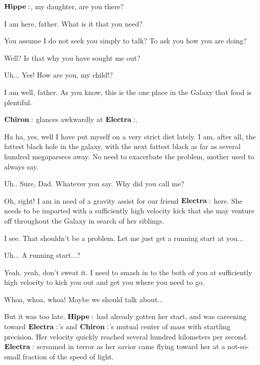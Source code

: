 \Chiron $\Hippe$, my daughter, are you there?

\Hippe I am here, father.  What is it that you need?

\Chiron You assume I do not seek you simply to talk?  To ask you how you are doing?

\Hippe Well?  Is that why you have sought me out?

\Chiron Uh... Yes!  How are you, my child!?

\Hippe I am well, father.  As you know, this is the one place in the Galaxy that food is plentiful.  

$\Chiron$ glances awkwardly at $\Electra$.

\Chiron Ha ha, yes, well I have put myself on a very strict diet lately.  I am, after all, the fattest black hole in the galaxy, with the next fattest black as far as several hundred megaparsecs away.  No need to exacerbate the problem, mother used to always say.

\Hippe Uh.. Sure, Dad.  Whatever you say.  Why did you call me?

\Chiron Oh, right!  I am in need of a gravity assist for our friend $\Electra$ here.  She needs to be imparted with a sufficiently high velocity kick that she may venture off throughout the Galaxy in search of her siblings.

\Hippe I see.  That shouldn't be a problem.  Let me just get a running start at you...

\Electra Uh... A running start...?

\Hippe Yeah, yeah, don't sweat it.  I need to smash in to the both of you at sufficiently high velocity to kick you out and get you where you need to go.

\Electra Whoa, whoa, whoa!  Maybe we should talk about...

But it was too late.  $\Hippe$ had already gotten her start, and was careening toward $\Electra$'s and $\Chiron$'s mutual center of mass with startling precision.  Her velocity quickly reached several hundred kilometers per second.  $\Electra$ screamed in terror as her savior came flying toward her at a not-so-small fraction of the speed of light.

